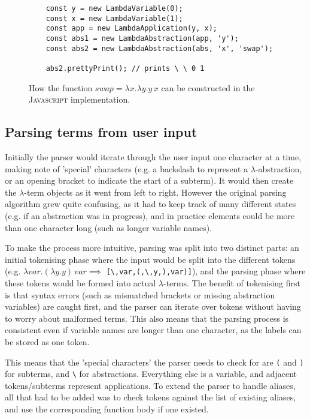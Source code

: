 \documentclass[11pt]{article}
\begin{document}
\begin{figure}
    \begin{verbatim}
    const y = new LambdaVariable(0);     
    const x = new LambdaVariable(1);      
    const app = new LambdaApplication(y, x);  
    const abs1 = new LambdaAbstraction(app, 'y');    
    const abs2 = new LambdaAbstraction(abs, 'x', 'swap'); 
    
    abs2.prettyPrint(); // prints \ \ 0 1
    \end{verbatim}
    \caption{How the function $swap = \lambda x. \lambda y. y \, x$ can be constructed in the \textsc{Javascript} implementation.}
    \label{fig:implementation}
\end{figure}

\subsection{Parsing terms from user input}
Initially the parser would iterate through the user input one character at a time, making note of 'special' characters (e.g. a backslash to represent a $\lambda$-abstraction, or an opening bracket to indicate the start of a subterm). It would then create the $\lambda$-term objects as it went from left to right. However the original parsing algorithm grew quite confusing, as it had to keep track of many different states (e.g. if an abstraction was in progress), and in practice elements could be more than one character long (such as longer variable names).

To make the process more intuitive, parsing was split into two distinct parts: an initial tokenising phase where the input would be split into the different tokens (e.g. $\lambda var. (\lambda y. y) \, var \implies$ \texttt{[\textbackslash,var,(,\textbackslash,y,),var)]}), and the parsing phase where these tokens would be formed into actual $\lambda$-terms. The benefit of tokenising first is that syntax errors (such as mismatched brackets or missing abstraction variables) are caught first, and the parser can iterate over tokens without having to worry about malformed terms. This also means that the parsing process is consistent even if variable names are longer than one character, as the labels can be stored as one token. 

This means that the 'special characters' the parser needs to check for are \texttt{(} and \texttt{)} for subterms, and \texttt{\textbackslash} for abstractions. Everything else is a variable, and adjacent tokens/subterms represent applications. To extend the parser to handle aliases, all that had to be added was to check tokens against the list of existing aliases, and use the corresponding function body if one existed.
\end{document}
